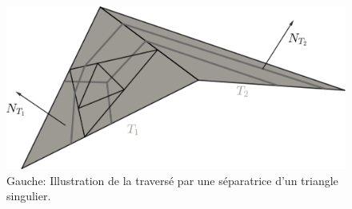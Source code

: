 \begin{figure}[!h]
  \centering
  \includegraphics[scale=0.32]{images/singulier_sepa_space.pdf}
  \caption{Gauche: Illustration de la traversé par une séparatrice d'un triangle singulier.}
  \label{fig:singulier_sepa_space}
\end{figure}

